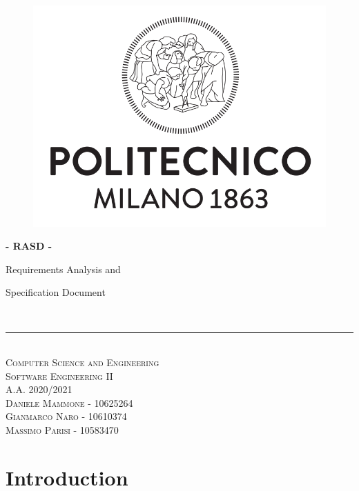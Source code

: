 \documentclass{article}
\begin{document}
\begin{titlepage}
	\begin{center}
		\begin{figure}
			\centering
			\includegraphics[scale=0.3]{LogoPolimi.PNG} \\
			[0.3cm]
		\end{figure}
		\Huge{\bfseries - RASD -} \\
		[0.5cm]
		\huge{Requirements Analysis and
			
			Specification Document} \\
		[1mm]
		\rule{300pt}{3pt} \\
		[1.0cm]
		\textsc{\Large Computer Science and Engineering} \\ 
		\textsc{\Huge Software Engineering II} \\
		\textsc{\Large A.A. 2020/2021} \\
		[1cm]
		\textsc{\LARGE Daniele Mammone - 10625264} \\
		\textsc{\LARGE Gianmarco Naro - 10610374} \\
		\textsc{\LARGE Massimo Parisi - 10583470} \\
	\end{center}
\end{titlepage}

\newpage
	
	\renewcommand\contentsname{Contents}
	\tableofcontents
	
\newpage

\section{Introduction}
\end{document}
